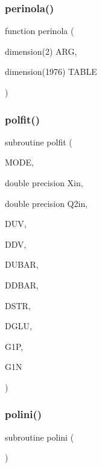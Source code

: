 \mbox{\label{polpdf_8f_ac1559ba9c27197fb573cafd2d02ef288}} 
\subsubsection{\texorpdfstring{perinola()}{perinola()}}
{\footnotesize\ttfamily function perinola (\begin{DoxyParamCaption}\item[{dimension(2)}]{A\+RG,  }\item[{dimension(1976)}]{T\+A\+B\+LE }\end{DoxyParamCaption})}

\mbox{\label{polpdf_8f_a24e333d1b3a2fb23b03ecbc8498bbc29}} 
\subsubsection{\texorpdfstring{polfit()}{polfit()}}
{\footnotesize\ttfamily subroutine polfit (\begin{DoxyParamCaption}\item[{}]{M\+O\+DE,  }\item[{double precision}]{Xin,  }\item[{double precision}]{Q2in,  }\item[{}]{D\+UV,  }\item[{}]{D\+DV,  }\item[{}]{D\+U\+B\+AR,  }\item[{}]{D\+D\+B\+AR,  }\item[{}]{D\+S\+TR,  }\item[{}]{D\+G\+LU,  }\item[{}]{G1P,  }\item[{}]{G1N }\end{DoxyParamCaption})}

\mbox{\label{polpdf_8f_ad28ff77cf4e713fdb1d299d0a95a3fd3}} 
\subsubsection{\texorpdfstring{polini()}{polini()}}
{\footnotesize\ttfamily subroutine polini (\begin{DoxyParamCaption}{ }\end{DoxyParamCaption})}

